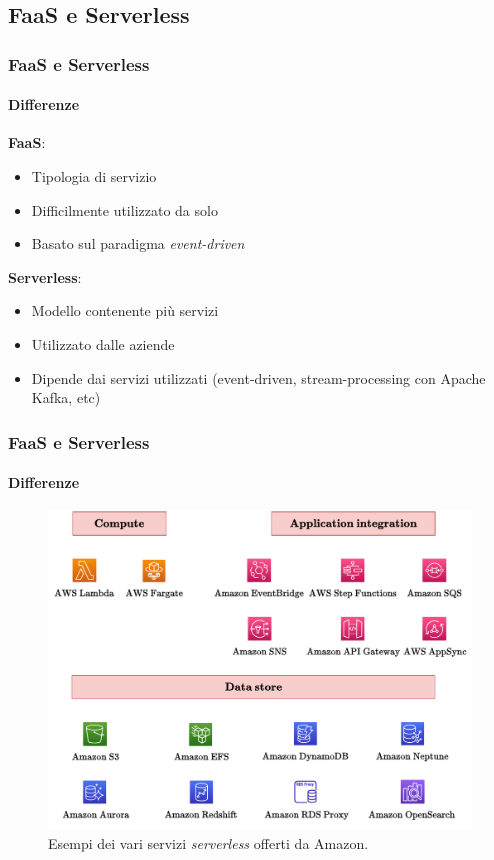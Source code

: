 \documentclass{beamer}
\begin{document}
	\subsection{FaaS e Serverless}
	\begin{frame}
		\frametitle{FaaS e Serverless}
		\framesubtitle{Differenze}
		\textbf{FaaS}:
		\begin{itemize}
			\item<2-7> Tipologia di servizio
			\item<4-7> Difficilmente utilizzato da solo
			\item<6-7> Basato sul paradigma \emph{event-driven}
		\end{itemize}

		\textbf{Serverless}:
		\begin{itemize}
			\item<3-7> Modello contenente più servizi 
			\item<5-7> Utilizzato dalle aziende
			\item<7> Dipende dai servizi utilizzati (event-driven, stream-processing con Apache Kafka, etc)
		\end{itemize}
	\end{frame}
	
	\begin{frame}
		\frametitle{FaaS e Serverless}
		\framesubtitle{Differenze}
		\begin{figure}
			\includegraphics[width=.9\textwidth]{img/AWS-Serverless-1.pdf}
			\caption*{Esempi dei vari servizi \emph{serverless} offerti da Amazon.}
		\end{figure}
	\end{frame}
	
\end{document}
